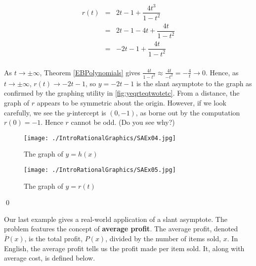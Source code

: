 \begin{ex}
\begin{enumerate}
 \[ \begin{array}{rcl}
 
 r(t) & = & 2t-1+\dfrac{4t^3}{1-t^2} \\
       &= &  2t-1-4t+\dfrac{4t}{1-t^2} \\
       & = & -2t-1 + \dfrac{4t}{1-t^2} \\ \end{array}\]
       
As $t \rightarrow \pm \infty$,  Theorem \ref{EBPolynomials} gives  $\frac{4t}{1-t^2} \approx \frac{4t}{-t^2} = -\frac{4}{t} \rightarrow 0$.  Hence, as $t \rightarrow \pm \infty$, $r(t) \rightarrow -2t-1$, so $y = -2t-1$ is the slant asymptote to the graph as confirmed by the graphing utility in \autoref{fig:yeqrteqtwotetc}.  From a distance, the graph of $r$ appears to be symmetric about the origin.  However, if we look carefully, we see the $y$-intercept is $(0,-1)$, as borne out by the computation $r(0) = -1$.  Hence $r$ cannot be odd.  (Do you see why?)

\begin{figure}
\begin{center}

\texttt{[image: ./IntroRationalGraphics/SAEx04.jpg]}

\caption{The graph of $y=h(x)$}
\label{fig:yeqhxeqxcubedetc}
\end{center}
\end{figure}

\begin{figure}
\begin{center}
  
\texttt{[image: ./IntroRationalGraphics/SAEx05.jpg]}

\caption{The graph of $y=r(t)$}
\label{fig:yeqrteqtwotetc}
\end{center}
\end{figure}

\qed

\end{enumerate}

\end{ex}

Our last example gives a real-world application of a slant asymptote. The problem features the concept of \textbf{average profit}. The average profit, denoted $\overline{P}(x)$,  is the total profit, $P(x)$,  divided by the number of items sold, $x$. In English, the average profit tells us the profit made per item sold. It, along with average cost, is defined below.

